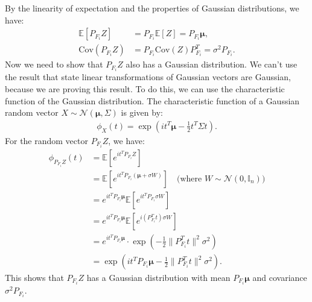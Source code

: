 \begin{answerenum}
    \item By the linearity of expectation and the properties of Gaussian distributions, we have:
        \begin{align*}
            \mathbb{E}[P_{F_i}Z] &= P_{F_i}\mathbb{E}[Z] = P_{F_i}\boldsymbol{\mu}, \\
            \text{Cov}(P_{F_i}Z) &= P_{F_i}\text{Cov}(Z)P_{F_i}^T = \sigma^2P_{F_i}.
        \end{align*}
        Now we need to show that $P_{F_i}Z$ also has a Gaussian distribution. We can't use the result that state linear transformations of Gaussian vectors are Gaussian, because we are proving this result.
        To do this, we can use the characteristic function of the Gaussian distribution. The characteristic function of a Gaussian random vector $X \sim \mathcal{N}(\boldsymbol{\mu}, \Sigma)$ is given by:
        \begin{align*}
            \phi_X(t) = \exp\left( i t^T \boldsymbol{\mu} - \frac{1}{2} t^T \Sigma t \right).
        \end{align*}
        For the random vector $P_{F_i}Z$, we have:
        \begin{align*}
            \phi_{P_{F_i}Z}(t) &= \mathbb{E}\left[ e^{i t^T P_{F_i}Z} \right] \\
            &= \mathbb{E}\left[ e^{i t^T P_{F_i}(\boldsymbol{\mu} + \sigma W)} \right] \quad \text{(where $W \sim \mathcal{N}(0, \mathbb{I}_n)$)} \\
            &= e^{i t^T P_{F_i}\boldsymbol{\mu}} \mathbb{E}\left[ e^{i t^T P_{F_i}\sigma W} \right] \\
            &= e^{i t^T P_{F_i}\boldsymbol{\mu}} \mathbb{E}\left[ e^{i (P_{F_i}^T t) \sigma W} \right] \\
            &= e^{i t^T P_{F_i}\boldsymbol{\mu}} \cdot \exp\left( -\frac{1}{2} \|P_{F_i}^T t\|^2 \sigma^2 \right) \\
            &= \exp\left( i t^T P_{F_i}\boldsymbol{\mu} - \frac{1}{2} \|P_{F_i}^T t\|^2 \sigma^2 \right).
        \end{align*}
        This shows that $P_{F_i}Z$ has a Gaussian distribution with mean $P_{F_i}\boldsymbol{\mu}$ and covariance $\sigma^2P_{F_i}$.


\end{answerenum}
